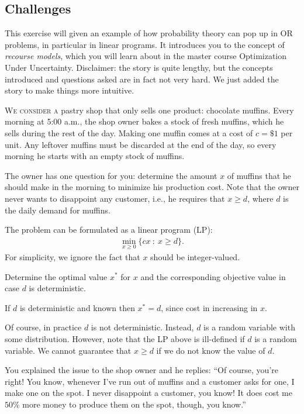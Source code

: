 \documentclass[assignments]{subfiles}
\begin{document}
\subsection{Challenges}

This exercise will given an example of how probability theory can pop up in OR problems, in particular in linear programs. It introduces you to the concept of \textit{recourse models}, which you will learn about in the master course Optimization Under Uncertainty. Disclaimer: the story is quite lengthy, but the concepts introduced and questions asked are in fact not very hard. We just added the story to make things more intuitive.

\textsc{We consider a} pastry shop that only sells one product: chocolate muffins. Every morning at 5:00 a.m., the shop owner bakes a stock of fresh muffins, which he sells during the rest of the day. Making one muffin comes at a cost of $c = \$ 1$ per unit. Any leftover muffins must be discarded at the end of the day, so every morning he starts with an empty stock of muffins.

The owner has one question for you: determine the amount $x$ of muffins that he should make in the morning to minimize his production cost. Note that the owner never wants to disappoint any customer, i.e., he requires that $x \geq d$, where $d$ is the daily demand for muffins.

The problem can be formulated as a linear program (LP):
\begin{align}
    \min_{x \geq 0} \{ cx \ : \ x \geq d \}.
\end{align}
For simplicity, we ignore the fact that $x$ should be integer-valued.

\begin{exercise}
Determine the optimal value $x^*$ for $x$ and the corresponding objective value in case $d$ is deterministic.
\begin{solution}
If $d$ is deterministic and known then $x^* = d$, since cost in increasing in $x$.
\end{solution}
\end{exercise}

Of course, in practice $d$ is not deterministic. Instead, $d$ is a random variable with some distribution. However, note that the LP above is ill-defined if $d$ is a random variable. We cannot guarantee that $x \geq d$ if we do not know the value of $d$.

You explained the issue to the shop owner and he replies: ``Of course, you're right! You know, whenever I've run out of muffins and a customer asks for one, I make one on the spot. I never disappoint a customer, you know! It does cost me $50 \%$ more money to produce them on the spot, though, you know.''
\end{document}
